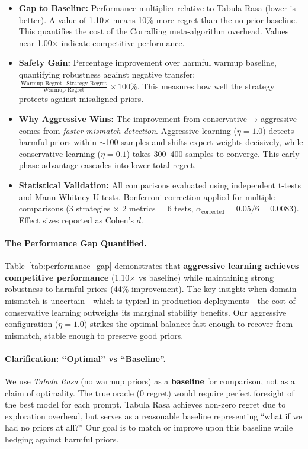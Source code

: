 \begin{table}[t]
\begin{itemize}[leftmargin=*,nosep]
\item \textbf{Gap to Baseline:} Performance multiplier relative to Tabula Rasa (lower is better). A value of 1.10$\times$ means 10\% more regret than the no-prior baseline. This quantifies the cost of the Corralling meta-algorithm overhead. Values near 1.00$\times$ indicate competitive performance.

\item \textbf{Safety Gain:} Percentage improvement over harmful warmup baseline, quantifying robustness against negative transfer: $\frac{\text{Warmup Regret} - \text{Strategy Regret}}{\text{Warmup Regret}} \times 100\%$. This measures how well the strategy protects against misaligned priors.

\item \textbf{Why Aggressive Wins:} The improvement from conservative → aggressive comes from \emph{faster mismatch detection}. Aggressive learning ($\eta=1.0$) detects harmful priors within $\sim$100 samples and shifts expert weights decisively, while conservative learning ($\eta=0.1$) takes 300--400 samples to converge. This early-phase advantage cascades into lower total regret.

\item \textbf{Statistical Validation:} All comparisons evaluated using independent t-tests and Mann-Whitney U tests. Bonferroni correction applied for multiple comparisons (3 strategies $\times$ 2 metrics = 6 tests, $\alpha_{\text{corrected}} = 0.05/6 = 0.0083$). Effect sizes reported as Cohen's $d$.
\end{itemize}

\vspace{0.5em}
\paragraph{The Performance Gap Quantified.}
Table~\ref{tab:performance_gap} demonstrates that \textbf{aggressive learning achieves competitive performance} (1.10$\times$ vs baseline) while maintaining strong robustness to harmful priors (44\% improvement). The key insight: when domain mismatch is uncertain—which is typical in production deployments—the cost of conservative learning outweighs its marginal stability benefits. Our aggressive configuration ($\eta=1.0$) strikes the optimal balance: fast enough to recover from mismatch, stable enough to preserve good priors.

\paragraph{Clarification: ``Optimal'' vs ``Baseline''.}
We use \emph{Tabula Rasa} (no warmup priors) as a \textbf{baseline} for comparison, not as a claim of optimality. The true oracle (0 regret) would require perfect foresight of the best model for each prompt. Tabula Rasa achieves non-zero regret due to exploration overhead, but serves as a reasonable baseline representing ``what if we had no priors at all?'' Our goal is to match or improve upon this baseline while hedging against harmful priors.


\end{table}
